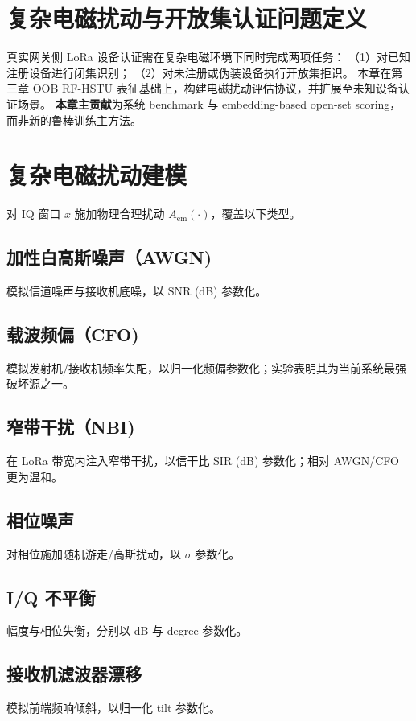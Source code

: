 
\section{复杂电磁扰动与开放集认证问题定义}
\label{sec:ch5_problem}

真实网关侧 LoRa 设备认证需在复杂电磁环境下同时完成两项任务：
（1）对已知注册设备进行闭集识别；
（2）对未注册或伪装设备执行开放集拒识。
本章在第三章 OOB RF-HSTU 表征基础上，构建电磁扰动评估协议，并扩展至未知设备认证场景。
\textbf{本章主贡献}为系统 benchmark 与 embedding-based open-set scoring，而非新的鲁棒训练主方法。

\section{复杂电磁扰动建模}
\label{sec:ch5_perturb}

对 IQ 窗口 $x$ 施加物理合理扰动 $A_{\mathrm{em}}(\cdot)$，覆盖以下类型。

\subsection{加性白高斯噪声（AWGN)}
模拟信道噪声与接收机底噪，以 SNR (dB) 参数化。

\subsection{载波频偏（CFO)}
模拟发射机/接收机频率失配，以归一化频偏参数化；实验表明其为当前系统最强破坏源之一。

\subsection{窄带干扰（NBI)}
在 LoRa 带宽内注入窄带干扰，以信干比 SIR (dB) 参数化；相对 AWGN/CFO 更为温和。

\subsection{相位噪声}
对相位施加随机游走/高斯扰动，以 $\sigma$ 参数化。

\subsection{I/Q 不平衡}
幅度与相位失衡，分别以 dB 与 degree 参数化。

\subsection{接收机滤波器漂移}
模拟前端频响倾斜，以归一化 tilt 参数化。

